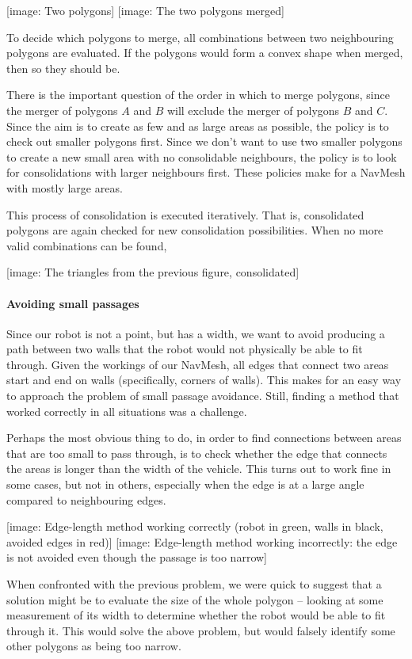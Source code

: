 \documentclass[10pt,twocolumn]{scrartcl}
\begin{document}
[image: Two polygons] [image: The two polygons merged]

To decide which polygons to merge, all combinations between two neighbouring polygons are evaluated. If the polygons would form a convex shape when merged, then so they should be.

There is the important question of the order in which to merge polygons, since the merger of polygons $A$ and $B$ will exclude the merger of polygons $B$ and $C$. Since the aim is to create as few and as large areas as possible, the policy is to check out smaller polygons first. Since we don't want to use two smaller polygons to create a new small area with no consolidable neighbours, the policy is to look for consolidations with larger neighbours first. These policies make for a NavMesh with mostly large areas.

This process of consolidation is executed iteratively. That is, consolidated polygons are again checked for new consolidation possibilities. When no more valid combinations can be found,

[image: The triangles from the previous figure, consolidated]

\paragraph{Avoiding small passages}
Since our robot is not a point, but has a width, we want to avoid producing a path between two walls that the robot would not physically be able to fit through. Given the workings of our NavMesh, all edges that connect two areas start and end on walls (specifically, corners of walls). This makes for an easy way to approach the problem of small passage avoidance. Still, finding a method that worked correctly in all situations was a challenge.

Perhaps the most obvious thing to do, in order to find connections between areas that are too small to pass through, is to check whether the edge that connects the areas is longer than the width of the vehicle. This turns out to work fine in some cases, but not in others, especially when the edge is at a large angle compared to neighbouring edges.

[image: Edge-length method working correctly (robot in green, walls in black, avoided edges in red)] [image: Edge-length method working incorrectly: the edge is not avoided even though the passage is too narrow]

When confronted with the previous problem, we were quick to suggest that a solution might be to evaluate the size of the whole polygon -- looking at some measurement of its width to determine whether the robot would be able to fit through it. This would solve the above problem, but would falsely identify some other polygons as being too narrow.
\end{document}
